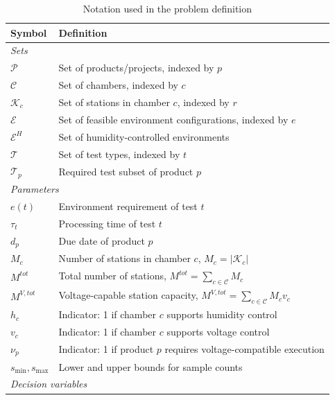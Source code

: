 \documentclass[11pt]{article}
\begin{document}
\begin{table}[H]
\centering
\caption{Notation used in the problem definition}
\label{tab:notation_tcssop}
\small
\setlength{\tabcolsep}{3pt}
\renewcommand{\arraystretch}{0.9}
\begin{tabular}{|l|p{}|}
\hline
\textbf{Symbol} & \textbf{Definition} \\ \hline
\multicolumn{2}{|l|}{\textit{Sets}} \\ \hline
\(\mathcal{P}\) & Set of products/projects, indexed by \(p\) \\ \hline
\(\mathcal{C}\) & Set of chambers, indexed by \(c\) \\ \hline
\(\mathcal{K}_c\) & Set of stations in chamber \(c\), indexed by \(r\) \\ \hline
\(\mathcal{E}\) & Set of feasible environment configurations, indexed by \(e\) \\ \hline
\(\mathcal{E}^{H}\) & Set of humidity-controlled environments \\ \hline
\(\mathcal{T}\) & Set of test types, indexed by \(t\) \\ \hline
\(\mathcal{T}_p\) & Required test subset of product \(p\) \\ \hline
\multicolumn{2}{|l|}{\textit{Parameters}} \\ \hline
\(e(t)\) & Environment requirement of test \(t\) \\ \hline
\(\tau_t\) & Processing time of test \(t\) \\ \hline
\(d_p\) & Due date of product \(p\) \\ \hline
\(M_c\) & Number of stations in chamber \(c\), \(M_c=|\mathcal{K}_c|\) \\ \hline
\(M^{tot}\) & Total number of stations, \(M^{tot}=\sum_{c\in\mathcal{C}}M_c\) \\ \hline
\(M^{V,tot}\) & Voltage-capable station capacity, \(M^{V,tot}=\sum_{c\in\mathcal{C}}M_cv_c\) \\ \hline
\(h_c\) & Indicator: 1 if chamber \(c\) supports humidity control \\ \hline
\(v_c\) & Indicator: 1 if chamber \(c\) supports voltage control \\ \hline
\(\nu_p\) & Indicator: 1 if product \(p\) requires voltage-compatible execution \\ \hline
\(s_{\min},s_{\max}\) & Lower and upper bounds for sample counts \\ \hline
\multicolumn{2}{|l|}{\textit{Decision variables}} \\ \hline

\end{tabular}
\end{table}
\end{document}
